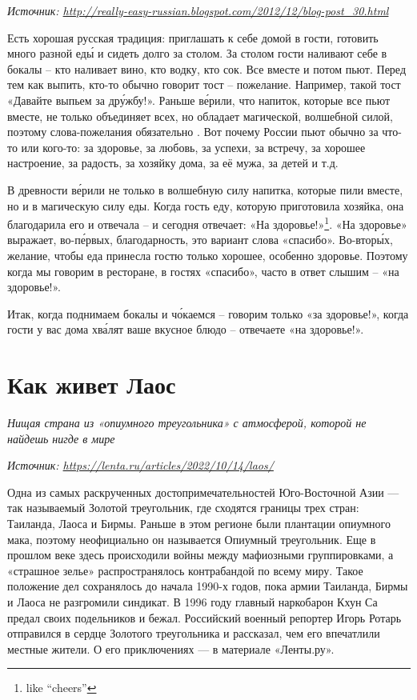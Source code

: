\textit{Источник: \url{http://really-easy-russian.blogspot.com/2012/12/blog-post_30.html}}

Есть хорошая русская традиция: приглашать к себе домой в гости, готовить много разной ед\'{ы} и сидеть долго за столом. За столом гости наливают себе в бокалы – кто наливает вино, кто водку, кто сок. Все вместе  и потом пьют.
Перед тем как выпить, кто-то обычно говорит тост – пожелание. Например, такой тост «Давайте выпьем за др\'{у}жбу!». Раньше в\'{е}рили, что напиток, которые все пьют вместе, не только объединяет всех, но обладает магической, волшебной силой, поэтому слова-пожелания обязательно .
Вот почему России пьют обычно за что-то или кого-то: за здоровье, за любовь, за успехи, за встречу, за хорошее настроение, за радость, за хозяйку дома, за её мужа, за детей и т.д.

В древности в\'{е}рили не только в волшебную силу напитка, которые пили вместе, но и в магическую силу еды. Когда гость  еду, которую приготовила хозяйка, она благодарила его и отвечала – и сегодня отвечает: «На здоровье!»\footnote{like ``cheers''}. «На здоровье» выражает, во-п\'{е}рвых, благодарность, это вариант слова «спасибо».
Во-втор\'{ы}х, желание, чтобы еда принесла гостю только хорошее, особенно здоровье. Поэтому когда мы говорим в ресторане, в гостях «спасибо», часто в ответ слышим – «на здоровье!».

Итак, когда поднимаем бокалы и ч\'{о}каемся -- говорим только «за здоровье!», когда гости у вас дома хв\'{а}лят ваше вкусное блюдо – отвечаете «на здоровье!».

\newpage
\section{Как живет Лаос}

\textit{Нищая страна из «опиумного треугольника» с атмосферой, которой не найдешь нигде в мире}

\textit{Источник: \url{https://lenta.ru/articles/2022/10/14/laos/}}

Одна из самых раскрученных достопримечательностей Юго-Восточной Азии — так называемый Золотой треугольник, где сходятся границы трех стран: Таиланда, Лаоса и Бирмы. Раньше в этом регионе были плантации опиумного мака, поэтому неофициально он называется Опиумный треугольник. Еще в прошлом веке здесь происходили войны между мафиозными группировками, а «страшное зелье» распространялось контрабандой по всему миру. Такое положение дел сохранялось до начала 1990-х годов, пока армии Таиланда, Бирмы и Лаоса не разгромили синдикат. В 1996 году главный наркобарон Кхун Са предал своих подельников и бежал. Российский военный репортер Игорь Ротарь отправился в сердце Золотого треугольника и рассказал, чем его впечатлили местные жители. О его приключениях — в материале «Ленты.ру».

